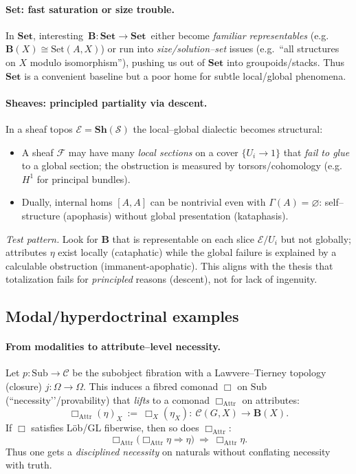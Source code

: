 \documentclass[11pt]{article}
\theoremstyle{upright}
\begin{document}
\paragraph{Set: fast saturation or size trouble.}
In $\mathbf{Set}$, interesting $\,\mathbf B:\mathbf{Set}\to\mathbf{Set}\,$ either become \emph{familiar representables} (e.g.\ $\mathbf B(X)\cong \mathrm{Set}(A,X)$) or run into \emph{size/solution–set} issues (e.g.\ “all structures on $X$ modulo isomorphism”), pushing us out of $\mathbf{Set}$ into groupoids/stacks. Thus $\mathbf{Set}$ is a convenient baseline but a poor home for subtle local/global phenomena.

\paragraph{Sheaves: principled partiality via descent.}
In a sheaf topos $\mathcal E=\mathbf{Sh}(\mathcal S)$ the local–global dialectic becomes structural:
\begin{itemize}[leftmargin=2em]
\item A sheaf $\mathcal F$ may have many \emph{local sections} on a cover $\{U_i\to 1\}$ that \emph{fail to glue} to a global section; the obstruction is measured by torsors/cohomology (e.g.\ $H^1$ for principal bundles). \citep{MacLaneMoerdijk1992, Giraud1971}
\item Dually, internal homs $[A,A]$ can be nontrivial even with $\Gamma(A)=\varnothing$: self–structure (apophasis) without global presentation (kataphasis).
\end{itemize}
\emph{Test pattern.} Look for $\mathbf B$ that is representable on each slice $\mathcal E/U_i$ but not globally; attributes $\eta$ exist locally (cataphatic) while the global failure is explained by a calculable obstruction (immanent-apophatic). This aligns with the thesis that totalization fails for \emph{principled} reasons (descent), not for lack of ingenuity. 

\subsection{Modal/hyperdoctrinal examples}\label{subsec:modal}
\paragraph{From modalities to attribute–level necessity.}
Let $p:\mathrm{Sub}\to\mathcal C$ be the subobject fibration with a Lawvere–Tierney topology (closure) $j:\Omega\to\Omega$. This induces a fibred comonad $\Box$ on $\mathrm{Sub}$ (``necessity’’/provability) that \emph{lifts} to a comonad $\Box_{\mathrm{Attr}}$ on attributes:
\[
\Box_{\mathrm{Attr}}(\eta)_X\ :=\ \Box_X(\eta_X):\ \mathcal C(G,X)\to \mathbf B(X).
\]
If $\Box$ satisfies Löb/GL fiberwise, then so does $\Box_{\mathrm{Attr}}$:
\[
\Box_{\mathrm{Attr}}\!\big(\Box_{\mathrm{Attr}}\eta \Rightarrow \eta\big)\ \Rightarrow\ \Box_{\mathrm{Attr}}\eta.
\]
Thus one gets a \emph{disciplined necessity} on naturals without conflating necessity with truth.
\end{document}
